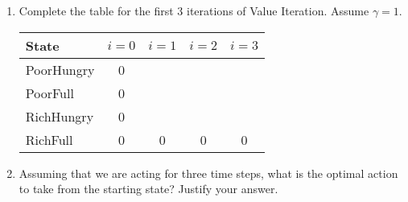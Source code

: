 \documentclass[12pt]{article}
\begin{document}
\begin{enumerate}

\item Complete the table for the first 3 iterations of Value
  Iteration. Assume $\gamma = 1$.

\begin{center}
\begin{tabular}{|l|c|c|c|c|} \hline
State      & $i=0$ & $i=1$ & $i=2$ & $i=3$ \\ \hline \hline
PoorHungry & 0     &       &       &       \\ \hline
PoorFull   & 0     &       &       &       \\ \hline
RichHungry & 0     &       &       &       \\ \hline
RichFull   & 0     & 0     & 0     & 0     \\ \hline
\end{tabular}
\end{center}

\item Assuming that we are acting for three time steps, what is the
  optimal action to take from the starting state? Justify your answer.

\end{enumerate}
\end{document}
